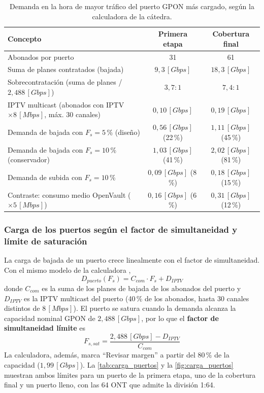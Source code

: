 \begin{table}[H]
    \centering
    \footnotesize
    \caption{Demanda en la hora de mayor tráfico del puerto GPON más cargado, según la calculadora de la cátedra.}
    \label{tab:demanda_puerto}
    \begin{tabular}{|l|c|c|}
        \hline
        \textbf{Concepto} & \textbf{Primera etapa} & \textbf{Cobertura final} \\
        \hline
        Abonados por puerto & 31 & 61 \\
        Suma de planes contratados (bajada) & $9{,}3 \, [Gbps]$ & $18{,}3 \, [Gbps]$ \\
        Sobrecontratación (suma de planes / $2{,}488 \, [Gbps]$) & $3{,}7:1$ & $7{,}4:1$ \\
        IPTV multicast (abonados con IPTV $\times 8 \, [Mbps]$, máx. 30 canales) & $0{,}10 \, [Gbps]$ & $0{,}19 \, [Gbps]$ \\
        \hline
        Demanda de bajada con $F_s = 5$\,\% (diseño) & $0{,}56 \, [Gbps]$ (22\,\%) & $1{,}11 \, [Gbps]$ (45\,\%) \\
        Demanda de bajada con $F_s = 10$\,\% (conservador) & $1{,}03 \, [Gbps]$ (41\,\%) & $2{,}02 \, [Gbps]$ (81\,\%) \\
        Demanda de subida con $F_s = 10$\,\% & $0{,}09 \, [Gbps]$ (8\,\%) & $0{,}18 \, [Gbps]$ (15\,\%) \\
        \hline
        Contraste: consumo medio OpenVault ($\times 5 \, [Mbps]$) & $0{,}16 \, [Gbps]$ (6\,\%) & $0{,}31 \, [Gbps]$ (12\,\%) \\
        \hline
    \end{tabular}
\end{table}

\subsubsection{Carga de los puertos según el factor de simultaneidad y límite de saturación}
\label{sec:carga_puertos}
La carga de bajada de un puerto crece linealmente con el factor de simultaneidad. Con el mismo modelo de la calculadora \cite{calc_catedra},
\begin{equation}
    D_{puerto}(F_s) = C_{com} \cdot F_s + D_{IPTV}
    \label{eq:carga_puerto}
\end{equation}
donde $C_{com}$ es la suma de los planes de bajada de los abonados del puerto y $D_{IPTV}$ es la IPTV multicast del puerto (40\,\% de los abonados, hasta 30 canales distintos de $8 \, [Mbps]$). El puerto se satura cuando la demanda alcanza la capacidad nominal GPON de $2{,}488 \, [Gbps]$, por lo que el \textbf{factor de simultaneidad límite} es
\begin{equation}
    F_{s,sat} = \frac{2{,}488 \, [Gbps] - D_{IPTV}}{C_{com}}
    \label{eq:fs_sat}
\end{equation}
La calculadora, además, marca ``Revisar margen'' a partir del 80\,\% de la capacidad ($1{,}99 \, [Gbps]$). La \autoref{tab:carga_puertos} y la \autoref{fig:carga_puertos} muestran ambos límites para un puerto de la primera etapa, uno de la cobertura final y un puerto lleno, con las 64 ONT que admite la división 1:64.

